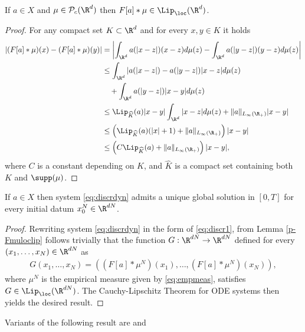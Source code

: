 \begin{lemma}\label{p-Fmuloclip}
If $a\in X$ and $\mu \in \mathcal{P}_c(\R^d)$ then $F[a]*\mu \in \Lip_{\loc}(\R^d)$.
\end{lemma}
\begin{proof}
For any compact set $K \subset \R^d$ and for every $x,y \in K$ it holds
\begin{align*}
|(F[a]*\mu)(x) - (F[a]*\mu)(y)| &= \left|\int_{\R^d}a(|x-z|)(x-z)d\mu(z) - \int_{\R^d}a(|y-z|)(y-z)d\mu(z)\right| \\
&\leq \int_{\R^d}|a(|x-z|)-a(|y-z|)|x-z|d\mu(z)\\
&\quad+ \int_{\R^d}a(|y-z|)|x-y|d\mu(z) \\
&\leq \Lip_{\widehat{K}}(a)|x-y| \int_{\R^d}|x-z|d\mu(z) + \|a\|_{L_{\infty}(\R_+)}|x-y| \\
&\leq \left(\Lip_{\widehat{K}}(a)(|x| + 1)+ \|a\|_{L_{\infty}(\R_+)}\right)|x-y| \\
& \leq \left(C\Lip_{\widehat{K}}(a) + \|a\|_{L_{\infty}(\R_+)} \right)|x-y|,
\end{align*}
where $C$ is a constant depending on $K$, and $\widehat{K}$ is a compact set containing both $K$ and $\supp(\mu)$.
\end{proof}



\begin{proposition}
If $a \in X$ then system \eqref{eq:discrdyn} admits a unique global solution in $[0,T]$ for every initial datum $x^{N}_0 \in \R^{dN}$.
\end{proposition}
\begin{proof}
Rewriting system \eqref{eq:discrdyn} in the form of \eqref{eq:discr1}, from Lemma \ref{p-Fmuloclip} follows trivially that the function $G:\R^{dN} \rightarrow \R^{dN}$ defined for every $(x_1, \ldots, x_N)\in \R^{dN}$ as
\begin{align*}
G(x_1, \ldots, x_N) = ((F[a]*\mu^N)(x_1),\ldots,(F[a]*\mu^N)(x_N)),
\end{align*}
where $\mu^N$ is the empirical measure given by \eqref{eq:empmeas}, satisfies $G \in \Lip_\loc(\R^{dN})$. The Cauchy-Lipschitz Theorem for ODE systems then yields the desired result.
\end{proof}

Variants of the following result are \cite[Lemma 6.7]{MFOC} and \cite[Lemma 4.7]{CanCarRos10}

